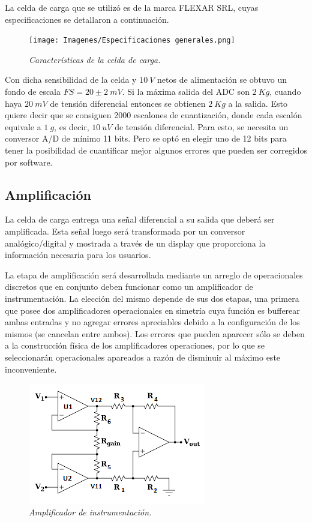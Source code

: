 \documentclass[12pt,A4paper,titlepage]{article}
\begin{document}
\hspace{1mm} La celda de carga que se utilizó es de la marca FLEXAR SRL, cuyas especificaciones se detallaron a continuación.

\begin{figure}[!h] 
  \centering
  \texttt{[image: Imagenes/Especificaciones generales.png]}
  \caption{\textit{Características de la celda de carga.}}
\end{figure}

 \hspace{1mm} Con dicha sensibilidad de la celda y \(10~V\) netos de alimentación se obtuvo un fondo de escala \(FS = 20\pm 2 ~mV\).
 \hspace{1mm} Si la máxima salida del ADC son \(2~Kg\), cuando haya \(20~mV\) de tensión diferencial entonces se obtienen \(2~Kg\) a la salida. Esto quiere decir que se consiguen 2000 escalones de cuantización, donde cada escalón equivale a \(1~g\), es decir, \(10~uV\) de tensión diferencial. Para esto, se necesita un conversor A/D de mínimo 11 bits. Pero se optó en elegir uno de 12 bits para tener la posibilidad de cuantificar mejor algunos errores que pueden ser corregidos por software. 

\subsection{Amplificación}
\hspace{1mm} La celda de carga entrega una señal diferencial a su salida que deberá ser amplificada. Esta señal luego será transformada por un conversor analógico/digital y mostrada a través de un display que proporciona la información necesaria para los usuarios. 

\bigskip
\hspace{1mm} La etapa de amplificación será desarrollada mediante un arreglo de operacionales discretos que en conjunto deben funcionar como un amplificador de instrumentación. La elección del mismo depende de sus dos etapas, una primera que posee dos amplificadores operacionales en simetría cuya función es bufferear ambas entradas y no agregar errores apreciables debido a la configuración de los mismos (se cancelan entre ambos).  Los errores que pueden aparecer sólo se deben a la construcción física de los amplificadores operaciones, por lo que se seleccionarán operacionales apareados a razón de disminuir al máximo este inconveniente.

\begin{figure}[!h] 
  \centering
  \includegraphics[scale=1.3]{Imagenes/Amplificador de instrumentación.png}
  \caption{\textit{Amplificador de instrumentación.}}
\end{figure}
\end{document}
